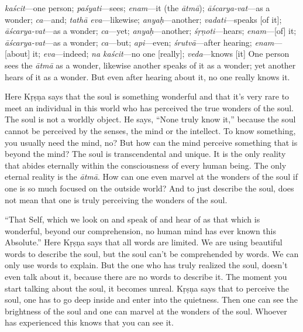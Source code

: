 {%
  \textit{kaścit}---one person; 
  \textit{paśyati}---sees; 
  \textit{enam}---it (the \textit{ātmā}); 
  \textit{āścarya-vat}---as a wonder; 
  \textit{ca}---and; 
  \textit{tathā eva}---likewise; 
  \textit{anyaḥ}---another; 
  \textit{vadati}---speaks [of it]; 
  \textit{āścarya-vat}---as a wonder; 
  \textit{ca}---yet; 
  \textit{anyaḥ}---another; 
  \textit{śṛṇoti}---hears; 
  \textit{enam}---[of] it; 
  \textit{āścarya-vat}---as a wonder; 
  \textit{ca}---but; 
  \textit{api}---even; 
  \textit{śrutvā}---after hearing; 
  \textit{enam}---[about] it; 
  \textit{eva}---indeed; 
  \textit{na kaścit}---no one [really]; 
  \textit{veda}---knows [it]
}
{%
  One person sees the \textit{ātmā} as a wonder, likewise another speaks of it as a wonder; yet another hears of it as a wonder. But even after hearing about it, no one really knows it.
}

Here Kṛṣṇa says that the soul is something wonderful and that it’s very rare to meet an individual in this world who has perceived the true wonders of the soul. The soul is not a worldly object. He says, “None truly know it,” because the soul cannot be perceived by the senses, the mind or the intellect. To know something, you usually need the mind, no? But how can the mind perceive something that is beyond the mind? The soul is transcendental and unique. It is the only reality that abides eternally within the consciousness of every human being. The only eternal reality is the \textit{ātmā}. How can one even marvel at the wonders of the soul if one is so much focused on the outside world? And to just describe the soul, does not mean that one is truly perceiving the wonders of the soul.

“That Self, which we look on and speak of and hear of as that which is wonderful, beyond our comprehension, no human mind has ever known this Absolute.” Here Kṛṣṇa says that all words are limited. We are using beautiful words to describe the soul, but the soul can’t be comprehended by words. We can only use words to explain. But the one who has truly realized the soul, doesn’t even talk about it, because there are no words to describe it. The moment you start talking about the soul, it becomes unreal. Kṛṣṇa says that to perceive the soul, one has to go deep inside and enter into the quietness. Then one can see the brightness of the soul and one can marvel at the wonders of the soul. Whoever has experienced this knows that you can see it.

